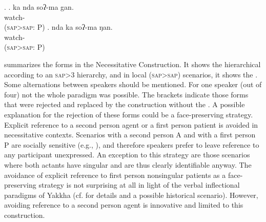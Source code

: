\ex. \ag. ka nda soʔ-ma gan.\\
  watch- \\
	(\textsc{sap}>\textsc{sap}: P)
\bg. nda  ka soʔ-ma ŋan.\\
    watch- \\
	(\textsc{sap}>\textsc{sap}: P) 



 summarizes the  forms in the Necessitative Construction. It shows the hierarchical  according to an \textsc{sap}>3 hierarchy, and in local (\textsc{sap}>\textsc{sap}) scenarios, it shows the  . Some alternations between speakers should be mentioned. For one speaker (out of four) not the whole paradigm was possible. The brackets indicate those forms that were rejected and replaced by the construction without the . A possible explanation for the rejection of these forms could be a face-preserving strategy. Explicit reference to a second person agent or a first person patient is avoided in necessitative contexts. Scenarios with a second person A and with a first person P are socially sensitive (e.g., ), and therefore speakers prefer to leave reference to any participant unexpressed. An exception to this strategy are those scenarios where both actants have singular  and  are thus clearly identifiable anyway. The avoidance of explicit reference to first person nonsingular patients as a face-preserving strategy is not surprising at all in light of the verbal inflectional paradigms of Yakkha (cf.  for details and a possible historical scenario). However, avoiding reference to a second person agent is innovative and limited to this construction.




